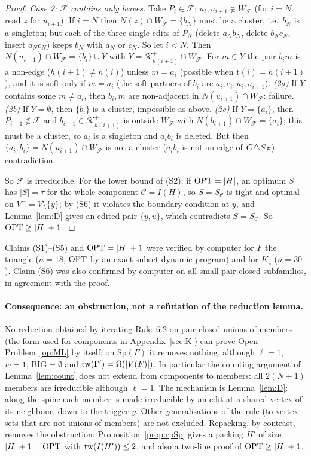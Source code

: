 \begin{proof}
\emph{Case 2: $\mathcal F$ contains only leaves.} Take $P_i\in\mathcal F$; $u_i,u_{i+1}\notin W_{\mathcal F}$ (for $i=N$ read $z$ for $u_{i+1}$). If $i=N$ then $N(z)\cap W_{\mathcal F}=\{b_N\}$ must be a cluster, i.e.\ $b_N$ is a singleton; but each of the three single edits of $P_N$ (delete $a_Nb_N$, delete $b_Nc_N$, insert $a_Nc_N$) keeps $b_N$ with $a_N$ or $c_N$. So let $i<N$. Then $N(u_{i+1})\cap W_{\mathcal F}=\{b_i\}\cup Y$ with $Y=\mathcal K^+_{h(i+1)}\cap W_{\mathcal F}$. For $m\in Y$ the pair $b_im$ is a non-edge ($h(i+1)\ne h(i)$) unless $m=a_i$ (possible when $\mathrm t(i)=h(i+1)$), and it is soft only if $m=a_i$ (the soft partners of $b_i$ are $a_i,c_i,u_i,u_{i+1}$). \emph{(2a)} If $Y$ contains some $m\ne a_i$, then $b_i,m$ are non-adjacent in $N(u_{i+1})\cap W_{\mathcal F}$: failure. \emph{(2b)} If $Y=\emptyset$, then $\{b_i\}$ is a cluster, impossible as above. \emph{(2c)} If $Y=\{a_i\}$, then $P_{i+1}\notin\mathcal F$ and $b_{i+1}\in \mathcal K^+_{h(i+1)}$ is outside $W_{\mathcal F}$ with $N(b_{i+1})\cap W_{\mathcal F}=\{a_i\}$; this must be a cluster, so $a_i$ is a singleton and $a_ib_i$ is deleted. But then $\{a_i,b_i\}=N(u_{i+1})\cap W_{\mathcal F}$ is not a cluster ($a_ib_i$ is not an edge of $G\triangle S_{\mathcal F}$): contradiction.

So $\mathcal F$ is irreducible. For the lower bound of (S2): if $\mathrm{OPT}=|H|$, an optimum $S$ has $|S|=\tau$ for the whole component $\mathcal C=I(H)$, so $S=S_{\mathcal C}$ is tight and optimal on $V^-=V\setminus\{y\}$; by (S6) it violates the boundary condition at $y$, and Lemma~\ref{lem:D} gives an edited pair $\{y,u\}$, which contradicts $S=S_{\mathcal C}$. So $\mathrm{OPT}\ge|H|+1$.
\end{proof}
\begin{remark}\label{rem:fivecov}
Claims (S1)--(S5) and $\mathrm{OPT}=|H|+1$ were verified by computer for $F$ the triangle ($n=18$, $\mathrm{OPT}$ by an exact subset dynamic program) and for $K_4$ ($n=30$). Claim (S6) was also confirmed by computer on all small pair-closed subfamilies, in agreement with the proof.
\end{remark}

\paragraph{Consequence: an obstruction, not a refutation of the reduction lemma.}
No reduction obtained by iterating Rule~6.2 on pair-closed unions of members (the form used for components in Appendix~\ref{sec:K}) can prove Open Problem~\ref{op:ML} by itself: on $\mathrm{Sp}(F)$ it removes nothing, although $\ell=1$, $w=1$, $\mathrm{BIG}=\emptyset$ and $\mathrm{tw}(\Gamma')=\Omega(|V(F)|)$. In particular the counting argument of Lemma~\ref{lem:count} does not extend from components to members: all $2(N+1)$ members are irreducible although $\ell=1$. The mechanism is Lemma~\ref{lem:D}: along the spine each member is made irreducible by an edit at a shared vertex of its neighbour, down to the trigger $y$. Other generalisations of the rule (to vertex sets that are not unions of members) are not excluded. Repacking, by contrast, removes the obstruction: Proposition~\ref{prop:rpSp} gives a packing $H'$ of size $|H|+1=\mathrm{OPT}$ with $\mathrm{tw}(I(H'))\le2$, and also a two-line proof of $\mathrm{OPT}\ge|H|+1$.

